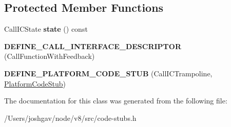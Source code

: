 \subsection*{Protected Member Functions}
\begin{DoxyCompactItemize}
\item 
Call\+I\+C\+State {\bfseries state} () const \hypertarget{classv8_1_1internal_1_1_call_i_c_trampoline_stub_a509b0b2c1866cb130ff77de9b720efb7}{}\label{classv8_1_1internal_1_1_call_i_c_trampoline_stub_a509b0b2c1866cb130ff77de9b720efb7}

\item 
{\bfseries D\+E\+F\+I\+N\+E\+\_\+\+C\+A\+L\+L\+\_\+\+I\+N\+T\+E\+R\+F\+A\+C\+E\+\_\+\+D\+E\+S\+C\+R\+I\+P\+T\+OR} (Call\+Function\+With\+Feedback)\hypertarget{classv8_1_1internal_1_1_call_i_c_trampoline_stub_a4092b55230a861e7be84517643457923}{}\label{classv8_1_1internal_1_1_call_i_c_trampoline_stub_a4092b55230a861e7be84517643457923}

\item 
{\bfseries D\+E\+F\+I\+N\+E\+\_\+\+P\+L\+A\+T\+F\+O\+R\+M\+\_\+\+C\+O\+D\+E\+\_\+\+S\+T\+UB} (Call\+I\+C\+Trampoline, \hyperlink{classv8_1_1internal_1_1_platform_code_stub}{Platform\+Code\+Stub})\hypertarget{classv8_1_1internal_1_1_call_i_c_trampoline_stub_a5edf9584ef64817e110856a4c596ba05}{}\label{classv8_1_1internal_1_1_call_i_c_trampoline_stub_a5edf9584ef64817e110856a4c596ba05}

\end{DoxyCompactItemize}


The documentation for this class was generated from the following file\+:\begin{DoxyCompactItemize}
\item 
/\+Users/joshgav/node/v8/src/code-\/stubs.\+h\end{DoxyCompactItemize}
